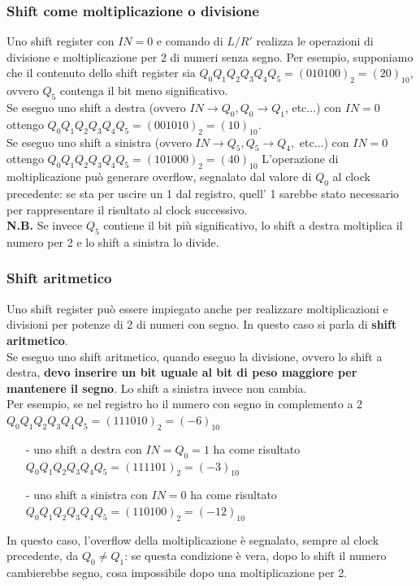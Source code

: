 \documentclass{article}
\begin{document}
\subsubsection{Shift come moltiplicazione o divisione}
Uno shift register con $IN=0$ e comando di $L/R'$ realizza le operazioni di divisione e moltiplicazione per 2 di numeri senza segno.
Per esempio, supponiamo che il contenuto dello shift register sia $Q_0Q_1Q_2Q_3Q_4Q_5 = (010100)_2 = (20)_{10}$, ovvero $Q_5$ contenga il bit meno significativo.\\
Se eseguo uno shift a destra (ovvero $IN \rightarrow Q_0, Q_0 \rightarrow Q_1$, etc...) con $IN=0$ ottengo $Q_0Q_1Q_2Q_3Q_4Q_5=(001010)_2=(10)_{10}$.\\
Se eseguo uno shift a sinistra (ovvero $IN \rightarrow Q_5, Q_5 \rightarrow Q_4,$ etc...) con $IN=0$ ottengo $Q_0Q_1Q_2Q_3Q_4Q_5=(101000)_2=(40)_{10}$
L’operazione di moltiplicazione può generare overflow, segnalato dal valore di $Q_0$ al clock precedente: se sta per uscire un 1 dal registro, quell' 1 sarebbe stato necessario per rappresentare il risultato al clock successivo.\\
\textbf{N.B.} Se invece $Q_5$ contiene il bit più significativo, lo shift a destra moltiplica il numero per 2 e lo shift a sinistra lo divide.
\subsubsection{Shift aritmetico}
Uno shift register può essere impiegato anche per realizzare moltiplicazioni e divisioni per potenze di 2 di numeri con segno. In questo caso si parla di \textbf{\color{cyan}shift aritmetico}.\\
Se eseguo uno shift aritmetico, quando eseguo la divisione, ovvero lo shift a destra, \textbf{devo inserire un bit uguale al bit di peso maggiore per mantenere il segno}. Lo shift a sinistra invece non cambia.
\vspace{0.2cm}\\
Per esempio, se nel registro ho il numero con segno in complemento a 2 $Q_0Q_1Q_2Q_3Q_4Q_5=(111010)_2 = (-6)_{10}$
\begin{itemize}
    \item [-] uno shift a destra con $IN=Q_0=1$ ha come risultato $Q_0Q_1Q_2Q_3Q_4Q_5=(111101)_2 = (-3)_{10}$
    \item [-] uno shift a sinistra con $IN=0$ ha come risultato $Q_0Q_1Q_2Q_3Q_4Q_5=(110100)_2 = (-12)_{10}$
\end{itemize}
In questo caso, l’overflow della moltiplicazione è segnalato, sempre al clock precedente, da $Q_0 \neq Q_1$: se questa condizione è vera, dopo lo shift il numero cambierebbe segno, cosa impossibile dopo una moltiplicazione per 2.
\end{document}
